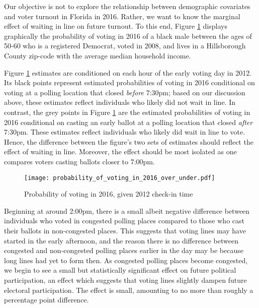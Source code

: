 \documentclass[12pt,titlepage]{article}
\begin{document}
Our objective is not to explore the relationship between demographic
covariates and voter turnout in Florida in 2016.  Rather, we want to
know the marginal effect of waiting in line on future turnout.  To
this end, Figure \ref{fig:prvoting2016} displays graphically the
probability of voting in 2016 of a black male between the ages of
50-60 who is a registered Democrat, voted in 2008, and lives in a
Hillsborough County zip-code with the average median household income.

Figure \ref{fig:prvoting2016} estimates are conditioned on each hour
of the early voting day in 2012. Its black points represent estimated
probabilities of voting in 2016 conditional on voting at a polling
location that closed \emph{before} 7:30pm; based on our discussion
above, these estimates reflect individuals who likely did not wait in
line.  In contrast, the grey points in Figure \ref{fig:prvoting2016}
are the estimated probabilities of voting in 2016 conditional on
casting an early ballot at a polling location that closed \emph{after}
7:30pm.  These estimates reflect individuals who likely did wait in
line to vote.  Hence, the difference between the figure's two sets of
estimates should reflect the effect of waiting in line.  Moreover, the
effect should be most isolated as one compares voters casting ballots
closer to 7:00pm.

\begin{figure}[!ht]
\caption{Probability of voting in 2016, given 2012 check-in time}
  \label{fig:prvoting2016}
  \centering
    \centering\texttt{[image: probability\_of\_voting\_in\_2016\_over\_under.pdf]}
\end{figure}

Beginning at around 2:00pm, there is a small albeit negative
difference between individuals who voted in congested polling places
compared to those who cast their ballots in non-congested places.
This suggests that voting lines may have started in the early
afternoon, and the reason there is no difference between congested and
non-congested polling places earlier in the day may be because long
lines had yet to form then. As congested polling places become
congested, we begin to see a small but statistically significant
effect on future political participation, an effect which suggests
that voting lines slightly dampen future electoral participation.  The
effect is small, amounting to no more than roughly a percentage point
difference.
\end{document}
